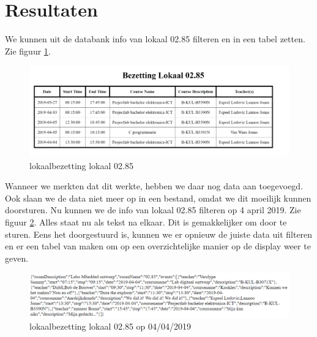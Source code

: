 \documentclass[a4paper,kul]{kulakarticle} %
\begin{document}
\section{Resultaten}

We kunnen uit de databank info van lokaal 02.85 filteren en in een tabel zetten. Zie figuur \ref{fig:vboutput}.

\begin{figure}[h]
	\centering
	\includegraphics[width=1\textwidth]{vbDatabank}
	\caption{lokaalbezetting lokaal 02.85}
	\label{fig:vboutput}
\end{figure}

Wanneer we merkten dat dit werkte, hebben we daar nog data aan toegevoegd. Ook slaan we de data niet meer op in een bestand, omdat we dit moeilijk kunnen doorsturen. Nu kunnen we de info van lokaal 02.85 filteren op 4 april 2019. Zie figuur \ref{fig:vbdata}. Alles staat nu als tekst na elkaar. Dit is gemakkelijker om door te sturen. Eens het doorgestuurd is, kunnen we er opnieuw de juiste data uit filteren en er een tabel van maken om op een overzichtelijke manier op de display weer te geven.

\begin{figure}[h]
	\centering
	\includegraphics[width=1\textwidth]{vbData02_85}
	\caption{lokaalbezetting lokaal 02.85 op 04/04/2019}
	\label{fig:vbdata}
\end{figure}
\end{document}
